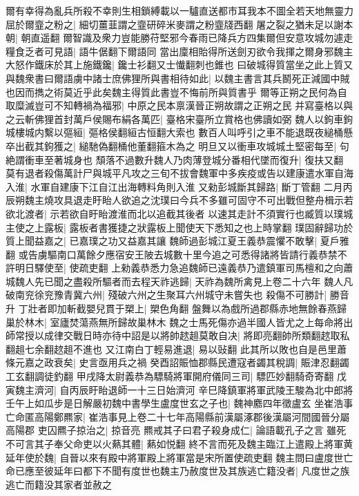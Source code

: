 爾有幸得為亂兵所殺不幸則生相鎖縛載以一驢直送都市耳我本不圖全若天地無靈力屈於爾韲之粉之|{
	細切薑韮謂之韲研碎米麥謂之粉韲牋西翻}
屠之裂之猶未足以謝本朝|{
	朝直遥翻}
爾智識及衆力豈能勝苻堅邪今春雨已降兵方四集爾但安意攻城勿遽走糧食乏者可見語|{
	語牛倨翻下爾語同}
當出廩相貽得所送劍刃欲令我揮之爾身邪魏主大怒作鐵床於其上施鐵鑱|{
	鑱士衫翻又士懴翻刺也錐也}
曰破城得質當坐之此上質又與魏衆書曰爾語虜中諸士庶佛狸所與書相待如此|{
	以魏主書言其兵鬭死正減國中賊也因而擕之術莫近乎此矣魏主得質此書豈不悔前所與質書乎}
爾等正朔之民何為自取糜滅豈可不知轉禍為福邪|{
	中原之民本禀漢晉正朔故謂之正朔之民}
并寫臺格以與之云斬佛狸首封萬戶侯賜布絹各萬匹|{
	臺格宋臺所立賞格也佛讀如弼}
魏人以鉤車鉤城樓城内繫以彄絙|{
	彄格侯翻絙古恒翻大索也}
數百人叫呼引之車不能退既夜縋桶懸卒出截其鉤獲之|{
	縋馳偽翻桶他董翻箍木為之}
明旦又以衝車攻城城土堅密每至|{
	句絶謂衝車至著城身也}
頹落不過數升魏人乃肉薄登城分番相代墜而復升|{
	復扶又翻}
莫有退者殺傷萬計尸與城平凡攻之三旬不拔會魏軍中多疾疫或告以建康遣水軍自海入淮|{
	水軍自建康下江自江出海轉料角則入淮}
又勑彭城斷其歸路|{
	斷丁管翻}
二月丙辰朔魏主燒攻具退走盱眙人欲追之沈璞曰今兵不多雖可固守不可出戰但整舟楫示若欲北渡者|{
	示若欲自盱眙渡淮而北以追截其後者}
以速其走計不須實行也臧質以璞城主使之上露板|{
	露板者書獲捷之狀露板上聞使天下悉知之也上時掌翻}
璞固辭歸功於質上聞益嘉之|{
	已嘉璞之功又益嘉其讓}
魏師過彭城江夏王義恭震懼不敢擊|{
	夏戶雅翻}
或告虜驅南口萬餘夕應宿安王陂去城數十里今追之可悉得諸將皆請行義恭禁不許明日驛使至|{
	使疏吏翻}
上勑義恭悉力急追魏師已遠義恭乃遣鎮軍司馬檀和之向蕭城魏人先已聞之盡殺所驅者而去程天祚逃歸|{
	天祚為魏所禽見上卷二十六年}
魏人凡破南兖徐兖豫青冀六州|{
	殘破六州之生聚耳六州城守未嘗失也}
殺傷不可勝計|{
	勝音升}
丁壯者即加斬截嬰兒貫于槊上|{
	槊色角翻}
盤舞以為戲所過郡縣赤地無餘春燕歸巢於林木|{
	室廬焚蕩燕無所歸故巢林木}
魏之士馬死傷亦過半國人皆尤之上每命將出師常授以成律交戰日時亦待中詔是以將帥趑趄莫敢自决|{
	將即亮翻帥所類翻趑取私翻趄七余翻趑趄不進也}
又江南白丁輕易進退|{
	易以䜴翻}
此其所以敗也自是邑里蕭條元嘉之政衰矣|{
	史言亟用兵之禍}
癸酉詔賑恤郡縣民遭寇者蠲其稅調|{
	賑津忍翻蠲工玄翻調徒釣翻}
甲戌降太尉義恭為驃騎將軍開府儀同三司|{
	驃匹妙翻騎奇寄翻}
戊寅魏主濟河|{
	自丙辰盱眙退師一十三日始濟河}
辛巳降鎮軍將軍武陵王駿為北中郎將壬午上如瓜步是日解嚴初魏中書學生盧度世玄之子也|{
	魏神䴥四年徵盧玄}
坐崔浩事亡命匿高陽鄭羆家|{
	崔浩事見上卷二十七年高陽縣前漢屬涿郡後漢屬河間國晉分屬高陽郡}
吏囚羆子掠治之|{
	掠音亮}
羆戒其子曰君子殺身成仁|{
	論語載孔子之言}
雖死不可言其子奉父命吏以火爇其體|{
	爇如悦翻}
終不言而死及魏主臨江上遣殿上將軍黄延年使於魏|{
	自晉以來有殿中將軍殿上將軍當是宋所置使疏吏翻}
魏主問曰盧度世亡命已應至彼延年曰都下不聞有度世也魏主乃赦度世及其族逃亡籍没者|{
	凡度世之族逃亡而籍没其家者並赦之}
